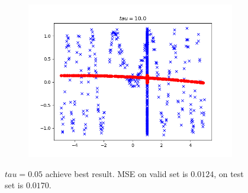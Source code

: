 \begin{answer}
\begin{figure}[htbp]
\begin{subfigure}[b]{0.5\linewidth}
    \end{subfigure}
    \begin{subfigure}[b]{0.5\linewidth}
        \centering
        \includegraphics[width=\linewidth]{pics/tau_10d0}
    \end{subfigure}

$tau = 0.05$ achieve best result. MSE on valid set is $0.0124$, on test set is $0.0170$.

\end{figure}
\end{answer}
